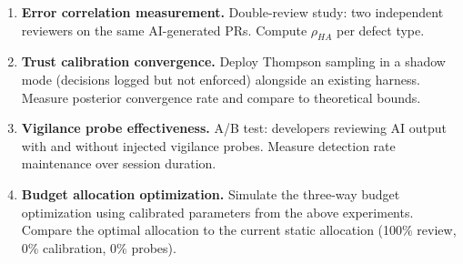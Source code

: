 \documentclass[11pt, a4paper, copyright]{googledeepmind}
\begin{document}
\begin{appendices}
\begin{enumerate}[leftmargin=*]
\item \textbf{Error correlation measurement.} Double-review study: two independent reviewers on the same AI-generated PRs. Compute $\rho_{HA}$ per defect type.

\item \textbf{Trust calibration convergence.} Deploy Thompson sampling in a shadow mode (decisions logged but not enforced) alongside an existing harness. Measure posterior convergence rate and compare to theoretical bounds.

\item \textbf{Vigilance probe effectiveness.} A/B test: developers reviewing AI output with and without injected vigilance probes. Measure detection rate maintenance over session duration.

\item \textbf{Budget allocation optimization.} Simulate the three-way budget optimization using calibrated parameters from the above experiments. Compare the optimal allocation to the current static allocation (100\% review, 0\% calibration, 0\% probes).
\end{enumerate}

\end{appendices}
\end{document}
